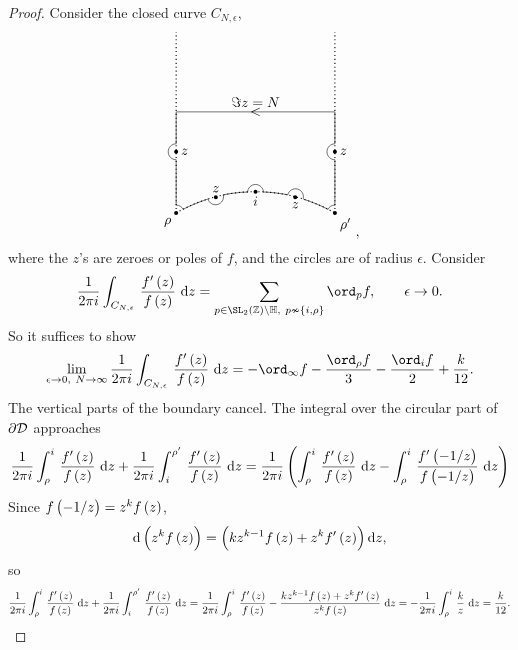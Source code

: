 \begin{proof}
Consider the closed curve $ C_{N, \epsilon} $,
$$
\begin{tikzpicture}[scale=4]
\draw [dotted, thick] (-0.5, 0.866) arc (120:60:1);
\draw [dotted, thick] (-0.5, 0.866) to (-0.5, 2);
\draw [dotted, thick] (0.5, 0.866) to (0.5, 2);
\draw (-0.5, 0.916) arc (90:25:0.05);
\draw (-0.455, 0.89) arc (117:107.5:1);
\draw (-0.3, 0.955) arc (-165:15:0.05);
\draw (-0.205, 0.98) arc (101:92:1);
\draw (-0.05, 0.995) arc (180:0:0.05);
\draw (0.205, 0.98) arc (79:88:1);
\draw (0.3, 0.955) arc (-15:165:0.05);
\draw (0.455, 0.89) arc (63:72.5:1);
\draw (0.5, 0.916) arc (90:155:0.05);
\draw (-0.5, 1.5) to node[above]{$ \Im z = N $} node{$ < $} (0.5, 1.5);
\draw (-0.5, 0.916) to (-0.5, 1.2);
\draw (-0.5, 1.2) arc (270:90:0.05);
\draw (-0.5, 1.3) to (-0.5, 1.5);
\draw (0.5, 0.916) to (0.5, 1.2);
\draw (0.5, 1.2) arc (270:90:0.05);
\draw (0.5, 1.3) to (0.5, 1.5);
\fill (0, 1) circle (0.0125) node[below]{$ i $};
\fill (-0.25, 0.965) circle (0.0125) node[above]{$ z $};
\fill (0.25, 0.965) circle (0.0125) node[below]{$ z $};
\fill (-0.5, 1.25) circle (0.0125) node[right]{$ z $};
\fill (-0.5, 0.866) circle (0.0125) node[below left]{$ \rho $};
\fill (0.5, 1.25) circle (0.0125) node[right]{$ z $};
\fill (0.5, 0.866) circle (0.0125) node[below right]{$ \rho' $};
\end{tikzpicture},
$$
where the $ z $'s are zeroes or poles of $ f $, and the circles are of radius $ \epsilon $. Consider
$$ \dfrac{1}{2\pi i}\intd{C_{N, \epsilon}}{}{\dfrac{f'\br{z}}{f\br{z}}}{z} = \sum_{p \in \SL_2\br{\ZZ} \backslash \HH, \ p \nsim \cbr{i, \rho}} \ord_p f, \qquad \epsilon \to 0. $$
So it suffices to show
$$ \lim_{\epsilon \to 0, \ N \to \infty} \dfrac{1}{2\pi i}\intd{C_{N, \epsilon}}{}{\dfrac{f'\br{z}}{f\br{z}}}{z} = -\ord_\infty f - \dfrac{\ord_\rho f}{3} - \dfrac{\ord_i f}{2} + \dfrac{k}{12}. $$
The vertical parts of the boundary cancel. The integral over the circular part of $ \partial\mathcal{D} $ approaches
$$ \dfrac{1}{2\pi i}\intd{\rho}{i}{\dfrac{f'\br{z}}{f\br{z}}}{z} + \dfrac{1}{2\pi i}\intd{i}{\rho'}{\dfrac{f'\br{z}}{f\br{z}}}{z} = \dfrac{1}{2\pi i}\br{\intd{\rho}{i}{\dfrac{f'\br{z}}{f\br{z}}}{z} - \intd{\rho}{i}{\dfrac{f'\br{-1 / z}}{f\br{-1 / z}}}{z}} $$
Since $ f\br{-1 / z} = z^kf\br{z} $,
$$ \d\br{z^kf\br{z}} = \br{kz^{k - 1}f\br{z} + z^kf'\br{z}}\d z, $$
so
$$ \dfrac{1}{2\pi i}\intd{\rho}{i}{\dfrac{f'\br{z}}{f\br{z}}}{z} + \dfrac{1}{2\pi i}\intd{i}{\rho'}{\dfrac{f'\br{z}}{f\br{z}}}{z} = \dfrac{1}{2\pi i}\intd{\rho}{i}{\dfrac{f'\br{z}}{f\br{z}} - \dfrac{kz^{k - 1}f\br{z} + z^kf'\br{z}}{z^kf\br{z}}}{z} = -\dfrac{1}{2\pi i}\intd{\rho}{i}{\dfrac{k}{z}}{z} = \dfrac{k}{12}. $$

\end{proof}
